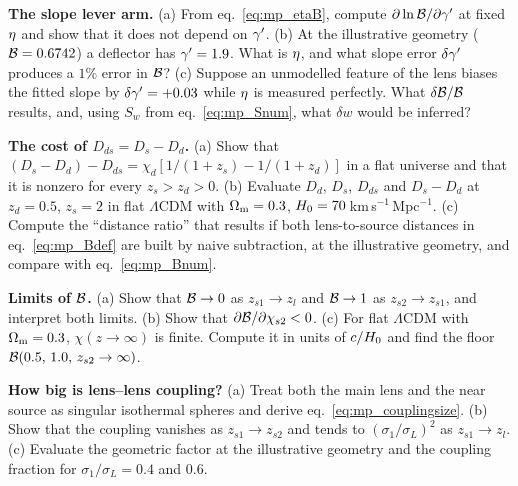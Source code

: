 \begin{exercise}
\label{ex:mp_slope_lever}
\textbf{The slope lever arm.}  (a) From eq.~\eqref{eq:mp_etaB}, compute
$\partial\ln\mathcal{B}/\partial\gamma'$ at fixed $\eta$ and show that it does
not depend on $\gamma'$.  (b) At the illustrative geometry ($\mathcal{B}=0.6742$) a
deflector has $\gamma'=1.9$.  What is $\eta$, and what slope error
$\delta\gamma'$ produces a $1\%$ error in $\mathcal{B}$?  (c) Suppose an unmodelled
feature of the lens biases the fitted slope by $\delta\gamma'=+0.03$ while
$\eta$ is measured perfectly.  What $\delta\mathcal{B}/\mathcal{B}$ results, and,
using $S_w$ from eq.~\eqref{eq:mp_Snum}, what $\delta w$ would be
inferred?
\end{exercise}

\begin{exercise}
\label{ex:mp_naive_distance}
\textbf{The cost of $D_{ds}=D_s-D_d$.}  (a) Show that
$(D_s-D_d)-D_{ds}=\chi_d[1/(1+z_s)-1/(1+z_d)]$ in a flat universe and
that it is nonzero for every $z_s>z_d>0$.  (b) Evaluate $D_d$, $D_s$,
$D_{ds}$ and $D_s-D_d$ at $z_d=0.5$, $z_s=2$ in flat $\Lambda$CDM with
$\Omega_{\mathrm{m}}=0.3$, $H_0=70$\,km\,s$^{-1}$\,Mpc$^{-1}$.  (c) Compute the
``distance ratio'' that results if both lens-to-source distances in
eq.~\eqref{eq:mp_Bdef} are built by naive subtraction, at the
illustrative geometry, and compare with eq.~\eqref{eq:mp_Bnum}.
\end{exercise}

\begin{exercise}
\label{ex:mp_limits}
\textbf{Limits of $\mathcal{B}$.}  (a) Show that $\mathcal{B}\to0$ as $z_{s1}\to z_l$
and $\mathcal{B}\to1$ as $z_{s2}\to z_{s1}$, and interpret both limits.
(b) Show that $\partial\mathcal{B}/\partial\chi_{s2}<0$.  (c) For flat
$\Lambda$CDM with $\Omega_{\mathrm{m}}=0.3$, $\chi(z\to\infty)$ is finite.  Compute it
in units of $c/H_0$ and find the floor
$\mathcal{B}(0.5,\,1.0,\,z_{s2}\to\infty)$.
\end{exercise}

\begin{exercise}
\label{ex:mp_coupling}
\textbf{How big is lens--lens coupling?}  (a) Treat both the main lens
and the near source as singular isothermal spheres and derive
eq.~\eqref{eq:mp_couplingsize}.  (b) Show that the coupling vanishes as
$z_{s1}\to z_{s2}$ and tends to $(\sigma_1/\sigma_L)^2$ as
$z_{s1}\to z_l$.  (c) Evaluate the geometric factor at the illustrative
geometry and the coupling fraction for $\sigma_1/\sigma_L=0.4$ and $0.6$.
\end{exercise}


